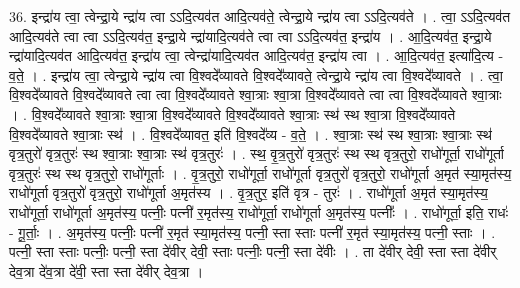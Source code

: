 \documentclass[17pt]{extarticle}
\begin{document}
36. इन्द्रा॑य त्वा॒ त्वेन्द्रा॒ये न्द्रा॑य त्वा ऽऽदि॒त्यव॑त आदि॒त्यव॑ते॒ त्वेन्द्रा॒ये न्द्रा॑य त्वा ऽऽदि॒त्यव॑ते । . त्वा॒ ऽऽदि॒त्यव॑त आदि॒त्यव॑ते त्वा त्वा ऽऽदि॒त्यव॑त॒ इन्द्रा॒ये न्द्रा॑यादि॒त्यव॑ते त्वा त्वा ऽऽदि॒त्यव॑त॒ इन्द्रा॑य । . आ॒दि॒त्यव॑त॒ इन्द्रा॒ये न्द्रा॑यादि॒त्यव॑त आदि॒त्यव॑त॒ इन्द्रा॑य त्वा॒ त्वेन्द्रा॑यादि॒त्यव॑त आदि॒त्यव॑त॒ इन्द्रा॑य त्वा । . आ॒दि॒त्यव॑त॒ इत्या॑दि॒त्य - व॒ते॒ । . इन्द्रा॑य त्वा॒ त्वेन्द्रा॒ये न्द्रा॑य त्वा वि॒श्वदे᳚व्यावते वि॒श्वदे᳚व्यावते॒ त्वेन्द्रा॒ये न्द्रा॑य त्वा वि॒श्वदे᳚व्यावते । . त्वा॒ वि॒श्वदे᳚व्यावते वि॒श्वदे᳚व्यावते त्वा त्वा वि॒श्वदे᳚व्यावते श्वा॒त्राः श्वा॒त्रा वि॒श्वदे᳚व्यावते त्वा त्वा वि॒श्वदे᳚व्यावते श्वा॒त्राः । . वि॒श्वदे᳚व्यावते श्वा॒त्राः श्वा॒त्रा वि॒श्वदे᳚व्यावते वि॒श्वदे᳚व्यावते श्वा॒त्राः स्थ॑ स्थ श्वा॒त्रा वि॒श्वदे᳚व्यावते वि॒श्वदे᳚व्यावते श्वा॒त्राः स्थ॑ । . वि॒श्वदे᳚व्यावत॒ इति॑ वि॒श्वदे᳚व्य - व॒ते॒ । . श्वा॒त्राः स्थ॑ स्थ श्वा॒त्राः श्वा॒त्राः स्थ॑ वृत्र॒तुरो॑ वृत्र॒तुरः॑ स्थ श्वा॒त्राः श्वा॒त्राः स्थ॑ वृत्र॒तुरः॑ । . स्थ॒ वृ॒त्र॒तुरो॑ वृत्र॒तुरः॑ स्थ स्थ वृत्र॒तुरो॒ राधो॑गूर्ता॒ राधो॑गूर्ता वृत्र॒तुरः॑ स्थ स्थ वृत्र॒तुरो॒ राधो॑गूर्ताः । . वृ॒त्र॒तुरो॒ राधो॑गूर्ता॒ राधो॑गूर्ता वृत्र॒तुरो॑ वृत्र॒तुरो॒ राधो॑गूर्ता अ॒मृत॑ स्या॒मृत॑स्य॒ राधो॑गूर्ता वृत्र॒तुरो॑ वृत्र॒तुरो॒ राधो॑गूर्ता अ॒मृत॑स्य । . वृ॒त्र॒तुर॒ इति॑ वृत्र - तुरः॑ । . राधो॑गूर्ता अ॒मृत॑ स्या॒मृत॑स्य॒ राधो॑गूर्ता॒ राधो॑गूर्ता अ॒मृत॑स्य॒ पत्नीः॒ पत्नी॑ र॒मृत॑स्य॒ राधो॑गूर्ता॒ राधो॑गूर्ता अ॒मृत॑स्य॒ पत्नीः᳚ । . राधो॑गूर्ता॒ इति॒ राधः॑ - गू॒र्ताः॒ । . अ॒मृत॑स्य॒ पत्नीः॒ पत्नी॑ र॒मृत॑ स्या॒मृत॑स्य॒ पत्नी॒ स्ता स्ताः पत्नी॑ र॒मृत॑ स्या॒मृत॑स्य॒ पत्नी॒ स्ताः । . पत्नी॒ स्ता स्ताः पत्नीः॒ पत्नी॒ स्ता दे॑वीर् देवी॒ स्ताः पत्नीः॒ पत्नी॒ स्ता दे॑वीः । . ता दे॑वीर् देवी॒ स्ता स्ता दे॑वीर् देव॒त्रा दे॑व॒त्रा दे॑वी॒ स्ता स्ता दे॑वीर् देव॒त्रा । \newline
\end{document}

